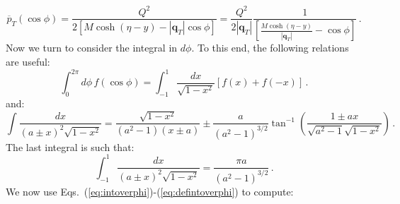 \documentclass[10pt,a4paper]{article}
\begin{document}
\begin{equation}\label{eq:overpT}
\overline{p}_T(\cos\phi) = \frac{Q^2}{2 \left[M\cosh\left(\eta - y\right)-|\mathbf{q}_T|\cos\phi\right]}=\frac{Q^2}{2 |\mathbf{q}_T|}\frac1{\left[\frac{M\cosh\left(\eta - y\right)}{|\mathbf{q}_T|}-\cos\phi\right]}\,.
\end{equation}
Now we turn to consider the integral in $d\phi$. To this end, the
following relations are useful:
\begin{equation}\label{eq:intoverphi}
\int_0^{2\pi}d\phi\, f(\cos\phi) = \int_{-1}^1\frac{dx}{\sqrt{1-x^2}}\left[f(x)+f(-x)\right]\,.
\end{equation}
and:
\begin{equation}\label{eq:complicatedintegral}
\int \frac{dx}{(a\pm
  x)^2\sqrt{1-x^2}}=\frac{\sqrt{1-x^2}}{(a^2-1)(x\pm
  a)}\pm\frac{a}{(a^2-1)^{3/2}}\tan^{-1}\left(\frac{1\pm ax}{\sqrt{a^2-1}\sqrt{1-x^2}}\right)\,.
\end{equation}
The last integral is such that:
\begin{equation}\label{eq:defintoverphi}
\int_{-1}^{1} \frac{dx}{(a\pm x)^2\sqrt{1-x^2}}=\frac{\pi a}{(a^2-1)^{3/2}}\,.
\end{equation}
We now use Eqs.~(\ref{eq:intoverphi})-(\ref{eq:defintoverphi}) to
compute:
\end{document}
